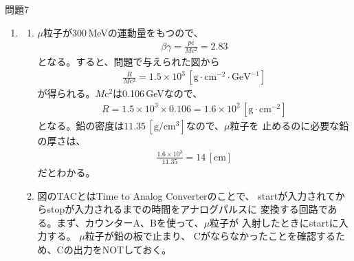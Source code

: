 \documentclass[fleqn]{jbook}
\begin{document}
\begin{answer}{問題7}{}
\begin{enumerate}
\begin{enumerate}
\item 偶然による同時計数が多すぎる場合、カウンターの
数をふやして、すべての信号のコインシデンスをとればよい。$i$番目の
カウンターから信号が出力される時間の割合を$\alpha_i(<1)$とすると、
すべてのカウンターからの信号が重なる確率は、$\prod\alpha_i$となり、
カウンターの数をふやせばふやすほど小さくなることがわかる。

\item
 実際に測定した時間は1秒間あたり$1-TS$秒なので、
真の計数は毎秒$S/(1-TS)$カウントである。

\item  ニュートリノは物質とほとんど相互作用しないため
無視する。

鉛の板を透過しにくい粒子の方が，鉛を厚くしたときのスケーラーの
カウント数の減り方は大きく，そちらがxに対応する．
電子は$\mu$粒子より質量が小さいため，散乱されやすいので，
電子の方が鉛の板を透過しにくいと考えられる．よって，
xが(I)電子，yが(III)$\mu$粒子だと考えることができる．

これらの粒子は、主に電磁相互作用によって電子や原子核に散乱され、
制動輻射で光子を放出してエネルギーを失う。
\end{enumerate}
\item 
\begin{enumerate}
\item  $\mu$粒子が300\,MeVの運動量をもつので、
\begin{eqnarray*}
 \beta\gamma = \frac{p\mathrm{c}}{M\mathrm{c}^2}=2.83
\end{eqnarray*}
となる。すると、問題で与えられた図から
\begin{eqnarray*}
 \frac{R}{M\mathrm{c}^2}
  = 1.5\times10^3\,[\mathrm{g\cdot cm^{-2}\cdot GeV^{-1}}]
\end{eqnarray*}
が得られる。$M\mathrm{c}^2$は0.106\,GeVなので、
\begin{eqnarray*}
 R = 1.5\times10^3\times0.106 = 1.6\times10^2\,[\mathrm{g\cdot cm^{-2}}]
\end{eqnarray*}
となる。鉛の密度は$11.35\,[\mathrm{g/cm^3}]$なので、$\mu$粒子を
止めるのに必要な鉛の厚さは、
\begin{eqnarray*}
 \frac{1.6\times10^3}{11.35} = 14\,[\mathrm{cm}]
\end{eqnarray*}
だとわかる。

\item 図のTACとはTime to Analog Converterのことで、
startが入力されてからstopが入力されるまでの時間をアナログパルスに
変換する回路である。まず、カウンターA、Bを使って、$\mu$粒子が
入射したときにstartに入力する。
$\mu$粒子が鉛の板で止まり、
Cがならなかったことを確認するため、Cの出力をNOTしておく。


\end{enumerate}
\end{enumerate}
\end{answer}
\end{document}
